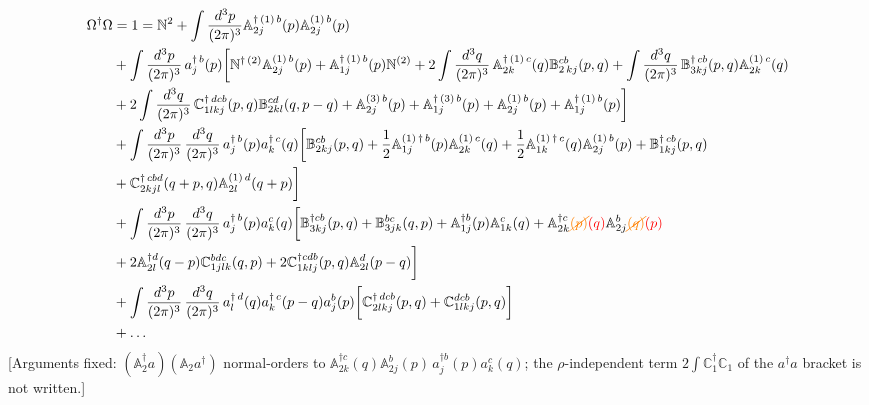 \documentclass[aps,prd,amsmath,amssymb,nofootinbib]{revtex4-2}
\def\mf#1{\mathbb{#1}}
\numberwithin{equation}{section}
\begin{document}
\begin{align}
     \Omega^{\dagger}\Omega & = 1 = \mf{N}^{2} + \int \frac{d^{3}p}{(2\pi)^{3}} \mf{A}^{\dagger\,(1)\, b}_{2j}(p)\mf{A}^{(1)\,b}_{2j}(p) \notag \\ & +\int \frac{d^{3}p}{(2\pi)^{3}}\, a^{\dagger\, b}_{j}(p) \bigg[\mf{N}^{\dagger\, (2)}\mf{A}^{(1)\, b}_{2j}(p)+\mf{A}^{\dagger\,(1)\, b}_{1j}(p)\mf{N}^{(2)} + 2\int\frac{d^{3}q}{(2\pi)^{3}}\,\mf{A}^{\dagger\,(1)\, c}_{2k}(q)\mf{B}^{cb}_{2\,kj}(p,q)+\int\frac{d^{3}q}{(2\pi)^{3}}\,\mf{B}^{\dagger\, cb}_{3kj}(p,q)\mf{A}^{(1)\,c}_{2k}(q)\notag \\ & +2\int\frac{d^{3}q}{(2\pi)^{3}}\,\mf{C}^{\dagger\, dcb}_{1lkj}(p,q)\mf{B}^{cd}_{2kl}(q,p-q)+\mf{A}^{(3)\, b}_{2j}(p)+\mf{A}^{\dagger\,(3)\, b}_{1j}(p)+\mf{A}^{(1)\, b}_{2j}(p)+\mf{A}^{\dagger\,(1)\, b}_{1j}(p)\bigg]\notag \\ & + \int \frac{d^{3}p}{(2\pi)^{3}}\, \frac{d^{3}q}{(2\pi)^{3}}\, a^{\dagger\, b}_{j}(p)a^{\dagger\, c}_{k}(q) \bigg[\mf{B}^{cb}_{2kj}(p,q)+\frac{1}{2}\mf{A}^{(1)\, \dagger\, b}_{1j}(p)\mf{A}^{(1)\, c}_{2k}(q)+\frac{1}{2} \mf{A}^{(1)\, \dagger\, c}_{1k}(q)\mf{A}^{(1)\, b}_{2j}(p)+\mf{B}^{\dagger\, cb}_{1kj}(p,q)\notag \\ & +\mf{C}^{\dagger\, cbd}_{2kjl}(q+p,q)\mf{A}^{(1)\,d}_{2l}(q+p)\bigg] \notag \\ & 
     + \int \frac{d^{3}p}{(2\pi)^{3}}\, \frac{d^{3}q}{(2\pi)^{3}}\, a^{\dagger\, b}_{j}(p)a^{ c}_{k}(q) \bigg[\mf{B}^{\dagger cb}_{3kj}(p,q)+\mf{B}^{bc}_{3jk}(q,p)+\mf{A}^{\dagger b}_{1j}(p)\mf{A}^{c}_{1k}(q) + \mf{A}^{\dagger c}_{2k}{\color{orange}\cancel{(p)}}{\color{red}(q)}\mf{A}^{b}_{2j}{\color{orange}\cancel{(q)}}{\color{red}(p)} \notag \\ & 
    + 2 \mf{A}^{\dagger d}_{2l}(q-p)\mf{C}^{bdc}_{1jlk}(q,p)
    + 2 
    \mf{C}^{\dagger cdb}_{1klj}
    (p,q)\mf{A}^{d}_{2l}(p-q) \bigg] \notag \\ & 
    + \int \frac{d^{3}p}{(2\pi)^{3}}\, \frac{d^{3}q}{(2\pi)^{3}}\, a^{\dagger\, d}_{l}(q)a^{\dagger\, c}_{k}(p-q)a^{b}_{j}(p)\bigg[\mf{C}^{\dagger\, dcb}_{2lkj}(p,q)+\mf{C}^{dcb}_{1lkj}(p,q)\bigg]\notag \\ & + \ldots
\end{align} {\color{red}[Arguments fixed: $(\mf{A}_2^\dagger a)(\mf{A}_2 a^\dagger)$ normal-orders to $\mf{A}^{\dagger c}_{2k}(q)\mf{A}^{b}_{2j}(p)\,a^{\dagger b}_j(p)a^c_k(q)$; the $\rho$-independent term $2\int\mf{C}_1^\dagger\mf{C}_1$ of the $a^\dagger a$ bracket is not written.]}\par\noindent 
\end{document}
